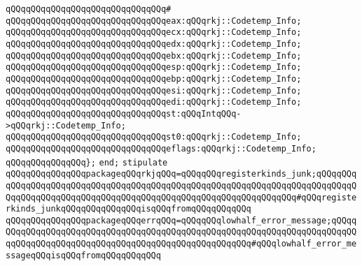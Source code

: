 \verb|qQQqqQQqqQQqqQQqqQQqqQQqqQQqqQQq#|\newline
\verb|qQQqqQQqqQQqqQQqqQQqqQQqqQQqqQQqeax:qQQqrkj::Codetemp_Info;|\newline
\newline
\verb|qQQqqQQqqQQqqQQqqQQqqQQqqQQqqQQqecx:qQQqrkj::Codetemp_Info;|\newline
\newline
\verb|qQQqqQQqqQQqqQQqqQQqqQQqqQQqqQQqedx:qQQqrkj::Codetemp_Info;|\newline
\newline
\verb|qQQqqQQqqQQqqQQqqQQqqQQqqQQqqQQqebx:qQQqrkj::Codetemp_Info;|\newline
\newline
\verb|qQQqqQQqqQQqqQQqqQQqqQQqqQQqqQQqesp:qQQqrkj::Codetemp_Info;|\newline
\newline
\verb|qQQqqQQqqQQqqQQqqQQqqQQqqQQqqQQqebp:qQQqrkj::Codetemp_Info;|\newline
\newline
\verb|qQQqqQQqqQQqqQQqqQQqqQQqqQQqqQQqesi:qQQqrkj::Codetemp_Info;|\newline
\newline
\verb|qQQqqQQqqQQqqQQqqQQqqQQqqQQqqQQqedi:qQQqrkj::Codetemp_Info;|\newline
\newline
\verb|qQQqqQQqqQQqqQQqqQQqqQQqqQQqqQQqst:qQQqIntqQQq->qQQqrkj::Codetemp_Info;|\newline
\newline
\verb|qQQqqQQqqQQqqQQqqQQqqQQqqQQqqQQqst0:qQQqrkj::Codetemp_Info;|\newline
\newline
\verb|qQQqqQQqqQQqqQQqqQQqqQQqqQQqqQQqeflags:qQQqrkj::Codetemp_Info;|\newline
\newline
\verb|qQQqqQQqqQQqqQQq};|\newline
\verb|end;|\newline
\newline
\verb|stipulate|\newline
\verb|qQQqqQQqqQQqqQQqpackageqQQqrkjqQQq=qQQqqQQqregisterkinds_junk;qQQqqQQqqQQqqQQqqQQqqQQqqQQqqQQqqQQqqQQqqQQqqQQqqQQqqQQqqQQqqQQqqQQqqQQqqQQqqQQqqQQqqQQqqQQqqQQqqQQqqQQqqQQqqQQqqQQqqQQqqQQqqQQqqQQqqQQq#qQQqregisterkinds_junkqQQqqQQqqQQqqQQqisqQQqfromqQQqqQQqqQQq|\newline
\verb|qQQqqQQqqQQqqQQqpackageqQQqerrqQQq=qQQqqQQqlowhalf_error_message;qQQqqQQqqQQqqQQqqQQqqQQqqQQqqQQqqQQqqQQqqQQqqQQqqQQqqQQqqQQqqQQqqQQqqQQqqQQqqQQqqQQqqQQqqQQqqQQqqQQqqQQqqQQqqQQqqQQqqQQqqQQq#qQQqlowhalf_error_messageqQQqisqQQqfromqQQqqQQqqQQq|\newline
